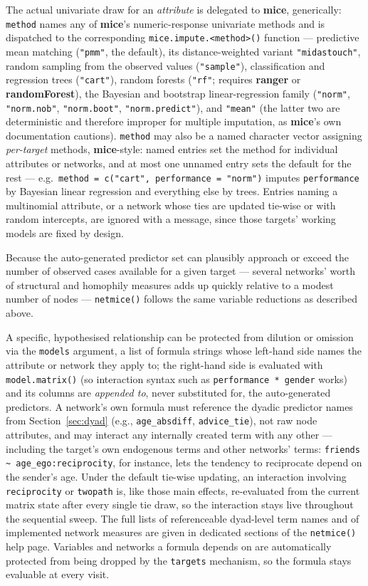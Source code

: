 \documentclass[11pt,a4paper]{article}
\newcommand{\pkg}[1]{\textbf{#1}}
\newcommand{\code}[1]{\texttt{#1}}
\begin{document}
The actual univariate draw for an \emph{attribute} is delegated to
\pkg{mice}, generically: \code{method} names any of \pkg{mice}'s
numeric-response univariate methods and is dispatched to the corresponding
\code{mice.impute.<method>()} function --- predictive mean matching
(\code{"pmm"}, the default), its distance-weighted variant
\code{"midastouch"}, random sampling from the observed values
(\code{"sample"}), classification and regression trees (\code{"cart"}),
random forests (\code{"rf"}; requires \pkg{ranger} or \pkg{randomForest}),
the Bayesian and bootstrap linear-regression family (\code{"norm"},
\code{"norm.nob"}, \code{"norm.boot"}, \code{"norm.predict"}), and
\code{"mean"} (the latter two are deterministic and therefore improper for
multiple imputation, as \pkg{mice}'s own documentation cautions).
\code{method} may also be a named character vector assigning
\emph{per-target} methods, \pkg{mice}-style: named entries set the method
for individual attributes or networks, and at most one unnamed entry sets
the default for the rest --- e.g.\ \code{method = c("cart", performance =
"norm")} imputes \code{performance} by Bayesian linear regression and
everything else by trees. Entries naming a multinomial attribute, or a
network whose ties are updated tie-wise or with random intercepts, are
ignored with a message, since those targets' working models are fixed by
design.

Because the auto-generated predictor set can plausibly approach or exceed
the number of observed cases available for a given target --- several
networks' worth of structural and homophily measures adds up quickly
relative to a modest number of nodes --- \code{netmice()} follows the same variable reductions as described above.

A specific, hypothesised relationship can be protected from dilution or
omission via the \code{models} argument, a list of formula strings whose
left-hand side names the attribute or network they apply to; the
right-hand side is evaluated with \code{model.matrix()} (so interaction
syntax such as \code{performance * gender} works) and its columns are
\emph{appended to}, never substituted for, the auto-generated predictors.
A network's own formula must reference the dyadic predictor names from
Section~\ref{sec:dyad} (e.g., \code{age\_absdiff}, \code{advice\_tie}), not
raw node attributes, and may interact any internally created term with any
other --- including the target's own endogenous terms and other networks'
terms: \code{friends \~{} age\_ego:reciprocity}, for instance, lets the
tendency to reciprocate depend on the sender's age. Under the default
tie-wise updating, an interaction involving \code{reciprocity} or
\code{twopath} is, like those main effects, re-evaluated from the current
matrix state after every single tie draw, so the interaction stays live
throughout the sequential sweep. The full lists of referenceable dyad-level
term names and of implemented network measures are given in dedicated
sections of the \code{netmice()} help page. Variables and networks a
formula depends on are automatically protected from being dropped by
the \code{targets} mechanism, so the formula stays evaluable at every
visit.
\end{document}
